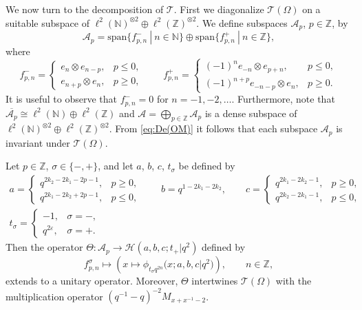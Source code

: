 \documentclass[pdftex]{sigma}
\numberwithin{equation}{section}
\numberwithin{theorem}{section}
\numberwithin{proposition}{section}
\numberwithin{lemma}{section}
\numberwithin{corollary}{section}
\numberwithin{definition}{section}
\numberwithin{example}{section}
\numberwithin{remark}{section}
\numberwithin{note}{section}
\newcommand{\N}{\mathbb N}
\newcommand{\Z}{\mathbb Z}
\newcommand{\eps}{\varepsilon}
\begin{document}
We now turn to the decomposition of $\mathcal T$. First we diagonalize $\mathcal T(\Omega)$ on a suitable subspace of $\ell^2(\N)^{\otimes 2} \oplus \ell^2(\Z)^{\otimes 2}$. We def\/ine subspaces $\mathcal A_p$, $p\in\Z$, by
\[
\mathcal A_p =  \mathrm{span}\{f_{p,n}^-\ | \ n\in \N\}  \oplus  \mathrm{span} \{f_{p,n}^+\ | \ n \in \Z \},
\]
where
\[
f_{p,n}^- = \begin{cases}
e_n \otimes e_{n-p}, & p \leq 0,\\
e_{n+p} \otimes e_n, & p \geq 0,
\end{cases}
 \qquad
f_{p,n}^+=
\begin{cases}
(-1)^n e_{-n} \otimes e_{p+n}, & p \leq 0,\\
(-1)^{n+p} e_{-n-p} \otimes e_n, & p \geq 0.
\end{cases}
\]
It is useful to observe that $f_{p,n}^-=0$ for $n=-1,-2,\ldots$. Furthermore, note that $\overline{\mathcal A_p} \cong \ell^2(\N) \oplus \ell^2(\Z)$ and $\mathcal A = \bigoplus_{p \in \Z} \mathcal A_p$ is a dense subspace of $\ell^2(\N)^{\otimes 2} \oplus \ell^2(\Z)^{\otimes 2}$. From \eqref{eq:De(OM)} it follows that each subspace $\mathcal A_p$ is invariant under $\mathcal T(\Omega)$.

\begin{proposition} \label{prop:Te}
Let $p \in \Z$, $\sigma \in \{-,+\}$, and let $a$, $b$, $c$, $t_\sigma$ be defined by
\begin{gather}
a= \begin{cases}
q^{2k_2-2k_1-2p-1}, & p \geq 0,\\
q^{2k_1-2k_2+2p-1}, & p \leq 0,
\end{cases}
 \qquad b = q^{1-2k_1-2k_2}, \qquad
c=\begin{cases}
q^{2k_1-2k_2-1}, & p \geq 0,\\
q^{2k_2-2k_1-1}, & p \leq 0,
\end{cases}
\nonumber\\  t_\sigma =
\begin{cases}
-1, & \sigma=-,\\
q^{2\eps}, & \sigma=+.
\end{cases}\label{eq:abct}
\end{gather}
Then the operator $\Theta:\mathcal A_p \rightarrow \mathcal H(a,b,c;t_+|q^2)$ defined by
\[
f_{p,n}^\sigma \mapsto \left(x\mapsto \phi_{t_\sigma q^{2n}}\big(x;a,b,c|q^2\big) \right), \qquad n \in \Z,
\]
extends to a unitary operator. Moreover, $\Theta$ intertwines $\mathcal T(\Omega)$ with the multiplication operator $(q^{-1}-q)^{-2}M_{x+x^{-1}-2}$.
\end{proposition}
\end{document}
